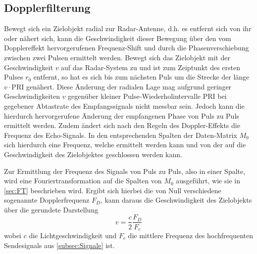 
\subsection{Dopplerfilterung}
Bewegt sich ein Zielobjekt radial zur Radar-Antenne, d.h. es entfernt sich von ihr oder nähert sich, kann die Geschwindigkeit dieser Bewegung über den vom Dopplereffekt hervorgerufenen Frequenz-Shift und durch die Phasenverschiebung zwischen zwei Pulsen ermittelt werden.
Bewegt sich das Zielobjekt mit der Geschwindigkeit $v$ auf das Radar-System zu und ist zum Zeiptunkt des ersten Pulses $r_0$ entfernt, so hat es sich bis zum nächsten Puls um die Strecke der länge $v\cdot\text{PRI}$ genähert. Diese Änderung der radialen Lage mag aufgrund geringer Geschwindigkeiten $v$ gegenüber kleiner Pulse-Wiederholintervalle PRI bei gegebener Abtastrate des Empfangssignals nicht messbar sein. Jedoch kann die hierdurch hervorgerufene Änderung der empfangenen Phase von Puls zu Puls ermittelt werden. Zudem ändert sich nach den Regeln des Doppler-Effekts die Frequenz des Echo-Signals. In den entsprechenden Spalten der Daten-Matrix $M_0$ sich hierdurch eine Frequenz, welche ermittelt werden kann und von der auf die Geschwindigkeit des Zielobjektes geschlossen werden kann.

Zur Ermittlung der Frequenz des Signals von Puls zu Puls, also in einer Spalte, wird eine Fouriertransformation auf die Spalten von $M_0$ ausgeführt, wie sie in \cref{sec:FT} beschrieben wird. Ergibt sich hierbei die von Null verschiedene sogenannte Dopplerfrequenz $F_D$, kann daraus die Geschwindigkeit des Zielobjekts über die gerundete Darstellung 
\begin{displaymath}
v = \frac{c}{2} \frac{F_D}{F_c}
\end{displaymath}
wobei $c$ die Lichtgeschwindigkeit und $F_c$ die mittlere Frequenz des hochfrequenten Sendesignals aus \cref{subsec:Signale} ist.
